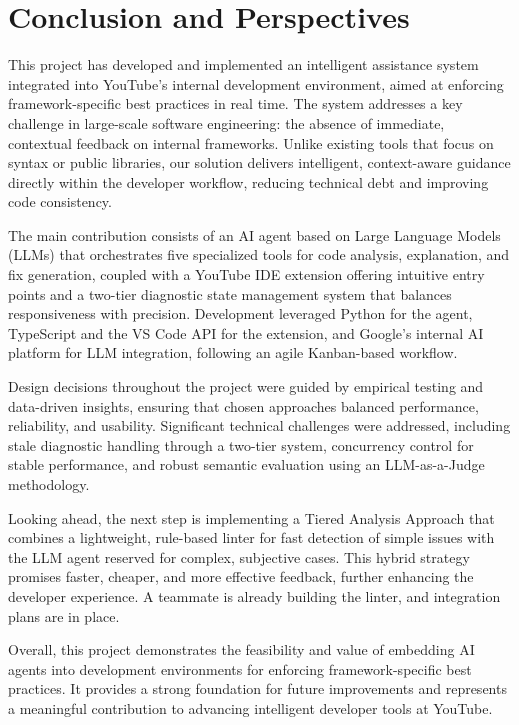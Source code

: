 \chapter{Conclusion and Perspectives}
\pagestyle{fancy}
\fancyhf{}
\fancyhead[R]{\bfseries\rightmark}
\fancyfoot[R]{\thepage}
\renewcommand{\headrulewidth}{0.5pt}
\renewcommand{\footrulewidth}{0pt}
\renewcommand{\chaptermark}[1]{\markboth{\MakeUppercase{\chaptername~\thechapter. #1 }}{}}
\renewcommand{\sectionmark}[1]{\markright{\thechapter.\thesection~ #1}}

\begin{spacing}{1.2}

This project has developed and implemented an intelligent assistance system integrated into YouTube's internal development environment, aimed at enforcing framework-specific best practices in real time. The system addresses a key challenge in large-scale software engineering: the absence of immediate, contextual feedback on internal frameworks. Unlike existing tools that focus on syntax or public libraries, our solution delivers intelligent, context-aware guidance directly within the developer workflow, reducing technical debt and improving code consistency.

The main contribution consists of an AI agent based on Large Language Models (LLMs) that orchestrates five specialized tools for code analysis, explanation, and fix generation, coupled with a YouTube IDE extension offering intuitive entry points and a two-tier diagnostic state management system that balances responsiveness with precision. Development leveraged Python for the agent, TypeScript and the VS Code API for the extension, and Google’s internal AI platform for LLM integration, following an agile Kanban-based workflow.

Design decisions throughout the project were guided by empirical testing and data-driven insights, ensuring that chosen approaches balanced performance, reliability, and usability. Significant technical challenges were addressed, including stale diagnostic handling through a two-tier system, concurrency control for stable performance, and robust semantic evaluation using an LLM-as-a-Judge methodology.

Looking ahead, the next step is implementing a Tiered Analysis Approach that combines a lightweight, rule-based linter for fast detection of simple issues with the LLM agent reserved for complex, subjective cases. This hybrid strategy promises faster, cheaper, and more effective feedback, further enhancing the developer experience. A teammate is already building the linter, and integration plans are in place.

Overall, this project demonstrates the feasibility and value of embedding AI agents into development environments for enforcing framework-specific best practices. It provides a strong foundation for future improvements and represents a meaningful contribution to advancing intelligent developer tools at YouTube.

\end{spacing}